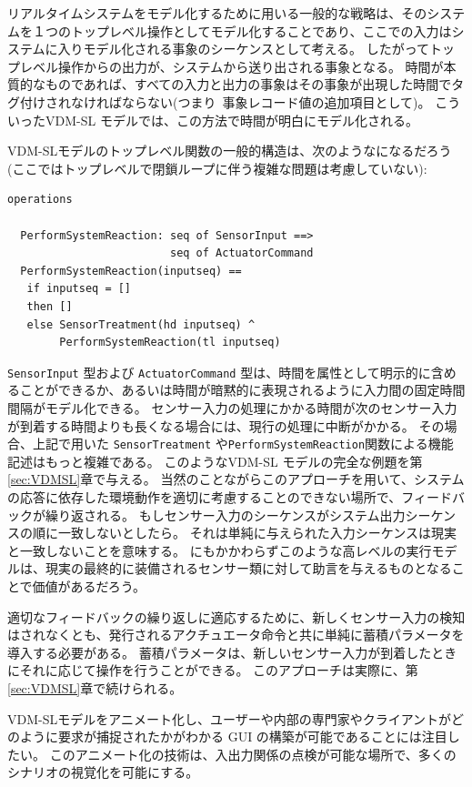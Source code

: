 \documentclass[\pformat,12pt]{jreport}
\begin{document}
リアルタイムシステムをモデル化するために用いる一般的な戦略は、そのシステムを１つのトップレベル操作としてモデル化することであり、ここでの入力はシステムに入りモデル化される事象のシーケンスとして考える。
したがってトップレベル操作からの出力が、システムから送り出される事象となる。
時間が本質的なものであれば、すべての入力と出力の事象はその事象が出現した時間でタグ付けされなければならない(つまり\ 事象レコード値の追加項目として)。
こういったVDM-SL モデルでは、この方法で時間が明白にモデル化される。

VDM-SLモデルのトップレベル関数の一般的構造は、次のようなになるだろう(ここではトップレベルで閉鎖ループに伴う複雑な問題は考慮していない):

\begin{lstlisting}
operations

  PerformSystemReaction: seq of SensorInput ==> 
                         seq of ActuatorCommand
  PerformSystemReaction(inputseq) ==
   if inputseq = []
   then []
   else SensorTreatment(hd inputseq) ^ 
        PerformSystemReaction(tl inputseq)
\end{lstlisting}

 \texttt{SensorInput} 型および \texttt{ActuatorCommand} 型は、時間を属性として明示的に含めることができるか、あるいは時間が暗黙的に表現されるように入力間の固定時間間隔がモデル化できる。
センサー入力の処理にかかる時間が次のセンサー入力が到着する時間よりも長くなる場合には、現行の処理に中断がかかる。
その場合、上記で用いた \texttt{SensorTreatment} や\texttt{PerformSystemReaction}関数による機能記述はもっと複雑である。
このようなVDM-SL モデルの完全な例題を第\ref{sec:VDMSL}章で与える。
当然のことながらこのアプローチを用いて、システムの応答に依存した環境動作を適切に考慮することのできない場所で、フィードバックが繰り返される。
もしセンサー入力のシーケンスがシステム出力シーケンスの順に一致しないとしたら。
それは単純に与えられた入力シーケンスは現実と一致しないことを意味する。
にもかかわらずこのような高レベルの実行モデルは、現実の最終的に装備されるセンサー類に対して助言を与えるものとなることで価値があるだろう。

適切なフィードバックの繰り返しに適応するために、新しくセンサー入力の検知はされなくとも、発行されるアクチュエータ命令と共に単純に蓄積パラメータを導入する必要がある。
蓄積パラメータは、新しいセンサー入力が到着したときにそれに応じて操作を行うことができる。
このアプローチは実際に、第\ref{sec:VDMSL}章で続けられる。

 VDM-SLモデルをアニメート化し、ユーザーや内部の専門家やクライアントがどのように要求が捕捉されたかがわかる GUI の構築が可能であることには注目したい。
このアニメート化の技術は、入出力関係の点検が可能な場所で、多くのシナリオの視覚化を可能にする。
\end{document}
